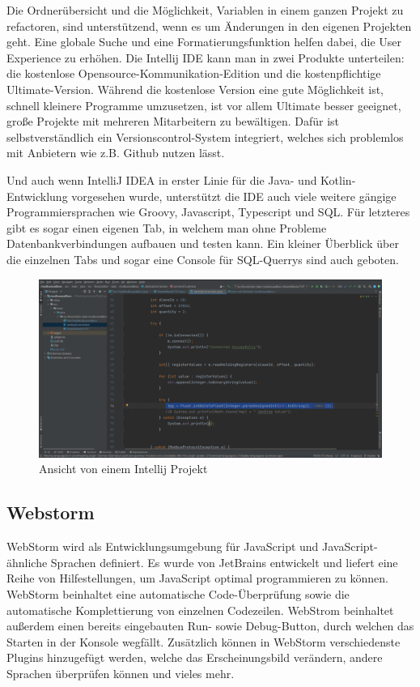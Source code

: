   Die Ordnerübersicht und die Möglichkeit, Variablen in einem ganzen Projekt zu refactoren, sind unterstützend, wenn es um Änderungen in den eigenen Projekten geht. Eine globale Suche und eine Formatierungsfunktion helfen dabei, die User Experience zu erhöhen. Die Intellij IDE kann man in zwei Produkte unterteilen: die kostenlose Opensource-Kommunikation-Edition und die kostenpflichtige Ultimate-Version. Während die kostenlose Version eine gute Möglichkeit ist, schnell kleinere Programme umzusetzen, ist vor allem Ultimate besser geeignet, große Projekte mit mehreren Mitarbeitern zu bewältigen. Dafür ist selbstverständlich ein Versionscontrol-System integriert, welches sich problemlos mit Anbietern wie z.B. Github nutzen lässt.  

Und auch wenn IntelliJ IDEA in erster Linie für die Java- und Kotlin-Entwicklung vorgesehen wurde, unterstützt die IDE auch viele weitere gängige Programmiersprachen wie Groovy, Javascript, Typescript und SQL. Für letzteres gibt es sogar einen eigenen Tab, in welchem man ohne Probleme Datenbankverbindungen aufbauen und testen kann. Ein kleiner Überblick über die einzelnen Tabs und sogar eine Console für SQL-Querrys sind auch geboten.   

\begin{figure}[h t]
  \centering
  \includegraphics[scale=0.2]{pics/IntellijOverfiew.png}
  \caption{Ansicht von einem Intellij Projekt}
  \label{fig:impl:WallboxIntellij}
\end{figure}

 
\subsection{Webstorm}
WebStorm wird als Entwicklungsumgebung für JavaScript und JavaScript-ähnliche Sprachen definiert. Es wurde von JetBrains entwickelt und liefert eine Reihe von Hilfestellungen, um JavaScript optimal programmieren zu können. WebStorm beinhaltet eine automatische Code-Überprüfung sowie die automatische Komplettierung von einzelnen Codezeilen. WebStrom beinhaltet außerdem einen bereits eingebauten Run- sowie Debug-Button, durch welchen das Starten in der Konsole wegfällt. Zusätzlich können in WebStorm verschiedenste Plugins hinzugefügt werden, welche das Erscheinungsbild verändern, andere Sprachen überprüfen können und vieles mehr.
 
